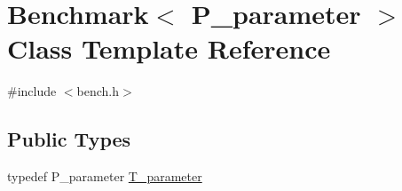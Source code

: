 \hypertarget{classBenchmark}{}\section{Benchmark$<$ P\+\_\+parameter $>$ Class Template Reference}
\label{classBenchmark}


{\ttfamily \#include $<$bench.\+h$>$}

\subsection*{Public Types}
\begin{DoxyCompactItemize}
\item 
typedef P\+\_\+parameter \hyperlink{classBenchmark_a00d2f8bc66032f89f357577c5809fff4}{T\+\_\+parameter}
\end{DoxyCompactItemize}
